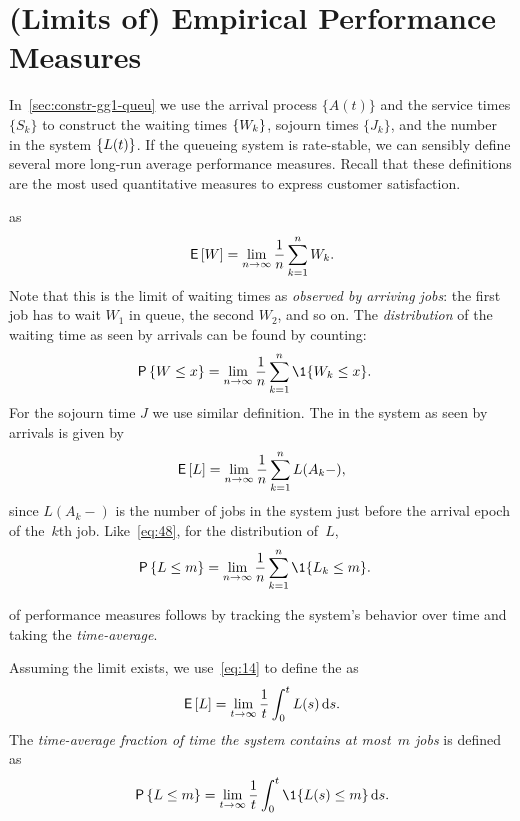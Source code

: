 \documentclass[stochastic-or.tex]{subfiles}
\begin{document}
\section{(Limits of) Empirical Performance Measures}
\label{sec:limits-of-empirical}

In~\cref{sec:constr-gg1-queu} we use the arrival process $\{A(t)\}$ and the service times $\{S_k\}$ to construct the waiting times $\{W_k\}$, sojourn times $\{J_k\}$, and the number in the system $\{L(t)\}$.
If the queueing system is rate-stable, we can sensibly define several more long-run average performance measures.
Recall that these definitions are the most used quantitative measures to express customer satisfaction.




  as
\begin{equation*}
 \,\mathsf{E}\left[W\right] = \lim_{n\to\infty} \frac 1 n\sum_{k=1}^n W_{k}.
\end{equation*}
Note that this is the limit of waiting times as \emph{observed by arriving jobs}:
 the first job has to wait $W_1$ in queue, the second $W_2$, and so on.
The \emph{distribution} of the waiting time as seen by arrivals can be found by counting:
\begin{align}\label{eq:48}
 \P{\W \leq x} &= \lim_{n\to\infty} \frac 1n\sum_{k=1}^n \1{\W_k\leq x}.
\end{align}
For the sojourn time  $J$  we use similar definition.
The  in the system as seen by arrivals is given by
\begin{equation}\label{eq:EQ}
\,\mathsf{E}\left[L\right] = \lim_{n\to\infty}\frac 1 n \sum_{k=1}^n L(A_k-),
\end{equation}
since $L(A_k-)$ is the number of jobs in the system just before the arrival epoch of the~$k$th job.
Like~\cref{eq:48}, for the distribution of~$L$,
\begin{align}
 \P{\L \leq m} &= \lim_{n\to\infty} \frac 1n\sum_{k=1}^n \1{\L_k\leq m}.
\end{align}



 of performance measures follows by tracking the system's behavior over time and taking the \emph{time-average}.

Assuming the limit exists, we use~\cref{eq:14} to define the  as
\begin{equation} \label{eq:46}
 \,\mathsf{E}\left[L\right] = \lim_{t\to\infty} \frac 1 t\int_0^t L(s) \,\textrm{d}s.
\end{equation}
 The \emph{time-average fraction of time the system contains at most~$m$ jobs} is defined as
\begin{equation*}
 \P{\L\leq m} =\lim_{t\to\infty} \frac 1 t\int_0^t \1{\L(s)\leq m} \d s.
\end{equation*}
\end{document}
